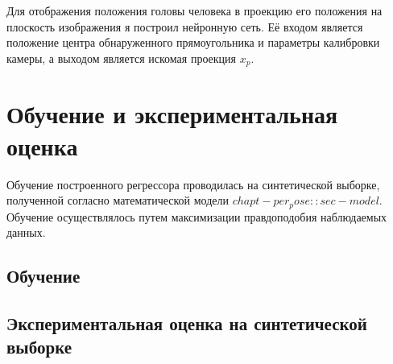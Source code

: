 Для отображения положения головы человека в проекцию его положения на плоскость изображения я построил нейронную сеть. Её входом является положение центра обнаруженного прямоугольника и параметры калибровки камеры, а выходом является искомая проекция $x_p$.

\section{Обучение и экспериментальная оценка}

Обучение построенного регрессора проводилась на синтетической выборке, полученной согласно математической модели $chapt-per_pose::sec-model$.
Обучение осуществлялось путем максимизации правдоподобия наблюдаемых данных.

\subsection{Обучение}


\subsection{Экспериментальная оценка на синтетической выборке}
\fi